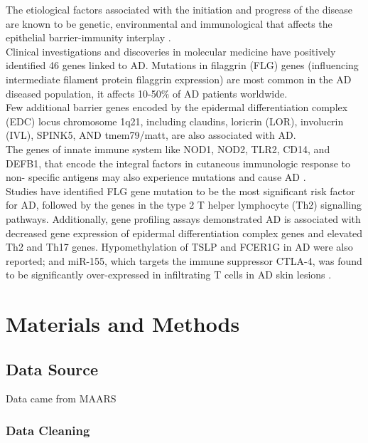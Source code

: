 \documentclass[journal, a4paper]{IEEEtran}
\begin{document}
The etiological factors associated with the initiation and progress of the disease are known to be genetic, environmental and immunological that affects the epithelial barrier-immunity interplay \cite{peng2015pathogenesis}.\\

Clinical investigations and discoveries in molecular medicine have positively identified 46 genes linked to AD. Mutations in filaggrin (FLG) genes (influencing intermediate filament protein filaggrin expression) are most common in the AD diseased population, it affects 10-50$\%$ of AD patients worldwide.\\

Few additional barrier genes encoded by the epidermal differentiation complex (EDC) locus chromosome 1q21, including claudins, loricrin (LOR), involucrin (IVL), SPINK5, AND tmem79/matt, are also associated with AD.\\

The genes of innate immune system like NOD1, NOD2, TLR2, CD14, and DEFB1, that encode the integral factors in cutaneous immunologic response to non- specific antigens may also experience mutations and cause AD \cite{guttman2017atopic}.\\

Studies have identified FLG gene mutation to be the most significant risk factor for AD, followed by the genes in the type 2 T helper lymphocyte (Th2) signalling pathways. 
Additionally, gene profiling assays demonstrated AD is associated with decreased gene expression of epidermal differentiation complex genes and elevated Th2 and Th17 genes. Hypomethylation of TSLP and FCER1G in AD were also reported; and miR-155, which targets the immune suppressor CTLA-4, was found to be significantly over-expressed in infiltrating T cells in AD skin lesions \cite{guttman2017atopic, bin2016genetic}.

\section{Materials and Methods}

\subsection{Data Source}

Data came from MAARS\\

\subsubsection*{Data Cleaning}
\end{document}
